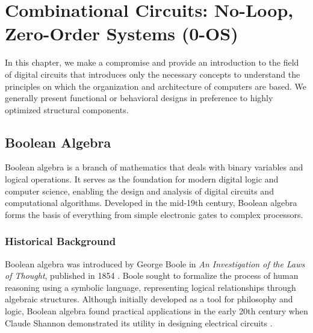 \chapter{Combinational Circuits:  No-Loop, Zero-Order Systems (0-OS)}\label{lect1}
\localtoc

In this chapter, we make a compromise and provide an introduction to the field of digital circuits that introduces only the necessary concepts to understand the principles on which the organization and architecture of computers are based. We generally present functional or behavioral designs in preference to highly optimized structural components.

\section{Boolean Algebra}
Boolean algebra is a branch of mathematics that deals with binary variables and logical operations. It serves as the foundation for modern digital logic and computer science, enabling the design and analysis of digital circuits and computational algorithms. Developed in the mid-19th century, Boolean algebra forms the basis of everything from simple electronic gates to complex processors.

\subsection{Historical Background}
Boolean algebra was introduced by George Boole in \emph{An Investigation of the Laws of Thought}, published in 1854 \cite{boole1854book}. Boole sought to formalize the process of human reasoning using a symbolic language, representing logical relationships through algebraic structures. Although initially developed as a tool for philosophy and logic, Boolean algebra found practical applications in the early 20th century when Claude Shannon demonstrated its utility in designing electrical circuits \cite{shannon38}.

